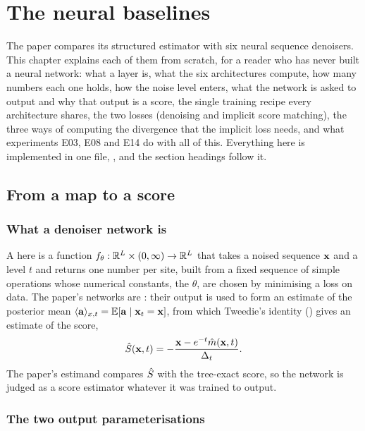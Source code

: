 \chapter{The neural baselines}
\label{ch:neural-baselines}

The paper compares its structured estimator with six neural sequence denoisers. This
chapter explains each of them from scratch, for a reader who has never built a neural
network: what a layer is, what the six architectures compute, how many numbers each one
holds, how the noise level enters, what the network is asked to output and why that
output is a score, the single training recipe every architecture shares, the two losses
(denoising and implicit score matching), the three ways of computing the divergence
that the implicit loss needs, and what experiments E03, E08 and E14 do with all of this.
Everything here is implemented in one file, , and
the section headings follow it.

\section{From a map to a score}
\label{sec:net-io}

\subsection{What a denoiser network is}

A  here is a function $f_\theta:\mathbb{R}^{L}\times(0,\infty)\to\mathbb{R}^{L}$
that takes a noised sequence $\mathbf{x}$ and a level $t$ and returns one number per site,
built from a fixed sequence of simple operations whose numerical constants, the
 $\theta$, are chosen by minimising a loss on data. The paper's networks
are : their output is used to form an estimate of the posterior mean
$\langle \mathbf{a} \rangle_{x,t}=\mathbb{E}[\mathbf{a}\mid\mathbf{x}_t=\mathbf{x}]$, from which Tweedie's identity
() gives an estimate of the score,
\begin{equation}
  \hat{S}(\mathbf{x},t)=-\frac{\mathbf{x}-e^{-t}\hat m(\mathbf{x},t)}{\Delta_t}.
  \label{eq:score-from-mean}
\end{equation}
The paper's estimand compares $\hat{S}$ with the tree-exact score, so the network is
judged as a score estimator whatever it was trained to output.

\subsection{The two output parameterisations}

